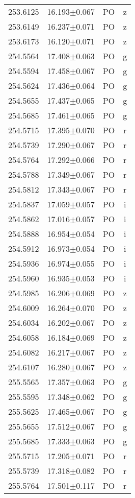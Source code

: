 \begin{table}
\begin{tabular}{cccc}
253.6125 & 16.193$\pm$0.067 & PO & z \\
253.6149 & 16.237$\pm$0.071 & PO & z \\
253.6173 & 16.120$\pm$0.071 & PO & z \\
254.5564 & 17.408$\pm$0.063 & PO & g \\
254.5594 & 17.458$\pm$0.067 & PO & g \\
254.5624 & 17.436$\pm$0.064 & PO & g \\
254.5655 & 17.437$\pm$0.065 & PO & g \\
254.5685 & 17.461$\pm$0.065 & PO & g \\
254.5715 & 17.395$\pm$0.070 & PO & r \\
254.5739 & 17.290$\pm$0.067 & PO & r \\
254.5764 & 17.292$\pm$0.066 & PO & r \\
254.5788 & 17.349$\pm$0.067 & PO & r \\
254.5812 & 17.343$\pm$0.067 & PO & r \\
254.5837 & 17.059$\pm$0.057 & PO & i \\
254.5862 & 17.016$\pm$0.057 & PO & i \\
254.5888 & 16.954$\pm$0.054 & PO & i \\
254.5912 & 16.973$\pm$0.054 & PO & i \\
254.5936 & 16.974$\pm$0.055 & PO & i \\
254.5960 & 16.935$\pm$0.053 & PO & i \\
254.5985 & 16.206$\pm$0.069 & PO & z \\
254.6009 & 16.264$\pm$0.070 & PO & z \\
254.6034 & 16.202$\pm$0.067 & PO & z \\
254.6058 & 16.184$\pm$0.069 & PO & z \\
254.6082 & 16.217$\pm$0.067 & PO & z \\
254.6107 & 16.280$\pm$0.067 & PO & z \\
255.5565 & 17.357$\pm$0.063 & PO & g \\
255.5595 & 17.348$\pm$0.062 & PO & g \\
255.5625 & 17.465$\pm$0.067 & PO & g \\
255.5655 & 17.512$\pm$0.067 & PO & g \\
255.5685 & 17.333$\pm$0.063 & PO & g \\
255.5715 & 17.205$\pm$0.071 & PO & r \\
255.5739 & 17.318$\pm$0.082 & PO & r \\
255.5764 & 17.501$\pm$0.117 & PO & r \\

\end{tabular}
\end{table}
